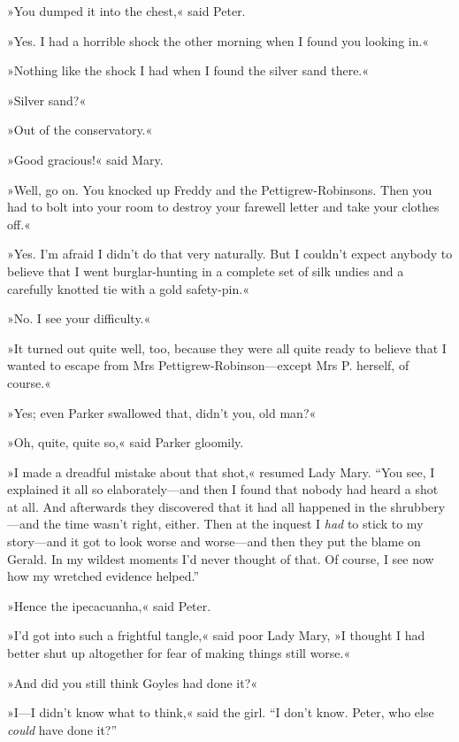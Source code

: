 »You dumped it into the chest,« said Peter.

»Yes. I had a horrible shock the other morning when I found you looking in.«

»Nothing like the shock I had when I found the silver sand there.«

»Silver sand?«

»Out of the conservatory.«

»Good gracious!« said Mary.

»Well, go on. You knocked up Freddy and the Pettigrew-Robinsons. Then you had to bolt into your room to destroy your farewell letter and take your clothes off.«

»Yes. I'm afraid I didn't do that very naturally. But I couldn't expect anybody to believe that I went burglar-hunting in a complete set of silk undies and a carefully knotted tie with a gold safety-pin.«

»No. I see your difficulty.«

»It turned out quite well, too, because they were all quite ready to believe that I wanted to escape from Mrs Pettigrew-Robinson\allowbreak---\allowbreak except Mrs P. herself, of course.«

»Yes; even Parker swallowed that, didn't you, old man?«

»Oh, quite, quite so,« said Parker gloomily.

»I made a dreadful mistake about that shot,« resumed Lady Mary. \enquote{You see, I explained it all so elaborately\allowbreak---\allowbreak and then I found that nobody had heard a shot at all. And afterwards they discovered that it had all happened in the shrubbery\allowbreak---\allowbreak and the time wasn't right, either. Then at the inquest I \textit{had} to stick to my story\allowbreak---\allowbreak and it got to look worse and worse\allowbreak---\allowbreak and then they put the blame on Gerald. In my wildest moments I'd never thought of that. Of course, I see now how my wretched evidence helped.}

»Hence the ipecacuanha,« said Peter.

»I'd got into such a frightful tangle,« said poor Lady Mary, »I thought I had better shut up altogether for fear of making things still worse.«

»And did you still think Goyles had done it?«

»I\allowbreak---\allowbreak I didn't know what to think,« said the girl. \enquote{I don't know. Peter, who else \textit{could} have done it?}

